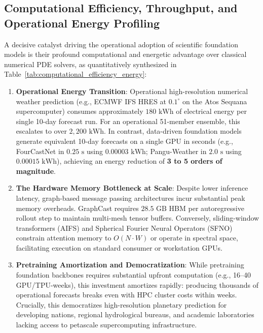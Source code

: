 \subsection{Computational Efficiency, Throughput, and Operational Energy Profiling}
\label{sec:computational_efficiency}
A decisive catalyst driving the operational adoption of scientific foundation models is their profound computational and energetic advantage over classical numerical PDE solvers, as quantitatively synthesized in Table~\ref{tab:computational_efficiency_energy}:
\begin{enumerate}
    \item \textbf{Operational Energy Transition}: Operational high-resolution numerical weather prediction (e.g., ECMWF IFS HRES at $0.1^\circ$ on the Atos Sequana supercomputer) consumes approximately $180\text{ kWh}$ of electrical energy per single 10-day forecast run. For an operational 51-member ensemble, this escalates to over $2{,}200\text{ kWh}$. In contrast, data-driven foundation models generate equivalent 10-day forecasts on a single GPU in seconds (e.g., FourCastNet in $0.25\text{ s}$ using $0.00003\text{ kWh}$; Pangu-Weather in $2.0\text{ s}$ using $0.00015\text{ kWh}$), achieving an energy reduction of \textbf{3 to 5 orders of magnitude}.
    \item \textbf{The Hardware Memory Bottleneck at Scale}: Despite lower inference latency, graph-based message passing architectures incur substantial peak memory overheads. GraphCast requires $28.5\text{ GB}$ HBM per autoregressive rollout step to maintain multi-mesh tensor buffers. Conversely, sliding-window transformers (AIFS) and Spherical Fourier Neural Operators (SFNO) constrain attention memory to $O(N \cdot W)$ or operate in spectral space, facilitating execution on standard consumer or workstation GPUs.
    \item \textbf{Pretraining Amortization and Democratization}: While pretraining foundation backbones requires substantial upfront computation (e.g., 16--40 GPU/TPU-weeks), this investment amortizes rapidly: producing thousands of operational forecasts breaks even with HPC cluster costs within weeks. Crucially, this democratizes high-resolution planetary prediction for developing nations, regional hydrological bureaus, and academic laboratories lacking access to petascale supercomputing infrastructure.
\end{enumerate}

